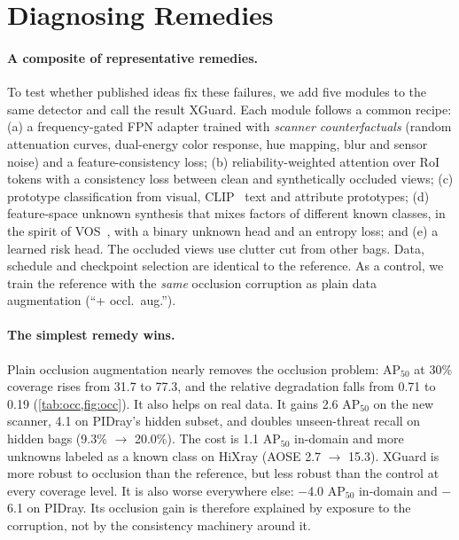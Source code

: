 \documentclass[10pt,twocolumn,letterpaper]{article}
\begin{document}
\section{Diagnosing Remedies}
\label{sec:remedies}
\paragraph{A composite of representative remedies.} To test whether published ideas fix these failures, we add five modules to the same detector and call the result XGuard. Each module follows a common recipe: (a) a frequency-gated FPN adapter trained with \emph{scanner counterfactuals} (random attenuation curves, dual-energy color response, hue mapping, blur and sensor noise) and a feature-consistency loss; (b) reliability-weighted attention over RoI tokens with a consistency loss between clean and synthetically occluded views; (c) prototype classification from visual, CLIP~\cite{radford2021clip} text and attribute prototypes; (d) feature-space unknown synthesis that mixes factors of different known classes, in the spirit of VOS~\cite{du2022vos}, with a binary unknown head and an entropy loss; and (e) a learned risk head. The occluded views use clutter cut from other bags. Data, schedule and checkpoint selection are identical to the reference. As a control, we train the reference with the \emph{same} occlusion corruption as plain data augmentation (``+ occl.\ aug.'').

\paragraph{The simplest remedy wins.} Plain occlusion augmentation nearly removes the occlusion problem: AP$_{50}$ at 30\% coverage rises from 31.7 to 77.3, and the relative degradation falls from 0.71 to 0.19 (\cref{tab:occ,fig:occ}). It also helps on real data. It gains 2.6 AP$_{50}$ on the new scanner, 4.1 on PIDray's hidden subset, and doubles unseen-threat recall on hidden bags (9.3\% $\rightarrow$ 20.0\%). The cost is 1.1 AP$_{50}$ in-domain and more unknowns labeled as a known class on HiXray (AOSE 2.7 $\rightarrow$ 15.3). XGuard is more robust to occlusion than the reference, but less robust than the control at every coverage level. It is also worse everywhere else: $-$4.0 AP$_{50}$ in-domain and $-$6.1 on PIDray. Its occlusion gain is therefore explained by exposure to the corruption, not by the consistency machinery around it.
\end{document}
